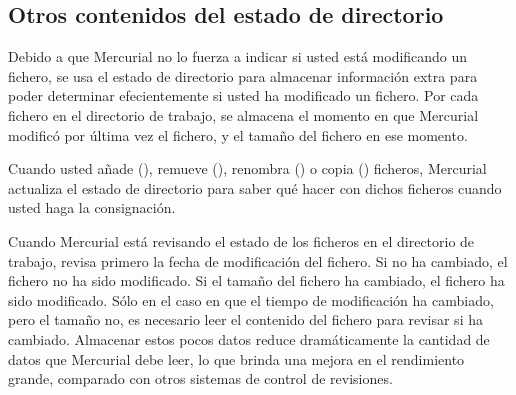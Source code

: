 \subsection{Otros contenidos del estado de directorio}

Debido a que Mercurial no lo fuerza a indicar si usted está
modificando un fichero, se usa el estado de directorio para almacenar
información extra para poder determinar efecientemente si usted ha
modificado un fichero. Por cada fichero en el directorio de trabajo,
se almacena el momento en que Mercurial modificó por última vez el
fichero, y el tamaño del fichero en ese momento.

Cuando usted añade (), remueve (), renombra
() o copia () ficheros, Mercurial actualiza
el estado de directorio para saber qué hacer con dichos ficheros
cuando usted haga la consignación.

Cuando Mercurial está revisando el estado de los ficheros en el
directorio de trabajo, revisa primero la fecha de modificación del
fichero. Si no ha cambiado, el fichero no ha sido modificado. Si el
tamaño del fichero ha cambiado, el fichero ha sido modificado. Sólo en
el caso en que el tiempo de modificación ha cambiado, pero el tamaño
no, es necesario leer el contenido del fichero para revisar si ha
cambiado. Almacenar estos pocos datos reduce dramáticamente la
cantidad de datos que Mercurial debe leer, lo que brinda una mejora en
el rendimiento grande, comparado con otros sistemas de control de
revisiones.

